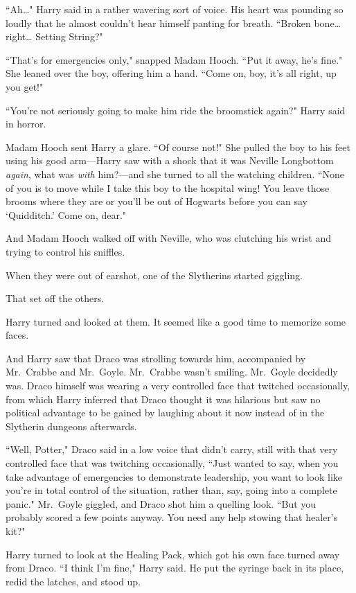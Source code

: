 ``Ah{\ldots}" Harry said in a rather wavering sort of voice. His heart was pounding so loudly that he almost couldn't hear himself panting for breath. ``Broken bone{\ldots} right{\ldots} Setting String?"

``That's for emergencies only," snapped Madam Hooch. ``Put it away, he's fine." She leaned over the boy, offering him a hand. ``Come on, boy, it's all right, up you get!"

``You're not seriously going to make him ride the broomstick again?" Harry said in horror.

Madam Hooch sent Harry a glare. ``Of course not!" She pulled the boy to his feet using his good arm—Harry saw with a shock that it was Neville Longbottom \emph{again}, what was \emph{with} him?—and she turned to all the watching children. ``None of you is to move while I take this boy to the hospital wing! You leave those brooms where they are or you'll be out of Hogwarts before you can say `Quidditch.' Come on, dear."

And Madam Hooch walked off with Neville, who was clutching his wrist and trying to control his sniffles.

When they were out of earshot, one of the Slytherins started giggling.

That set off the others.

Harry turned and looked at them. It seemed like a good time to memorize some faces.

And Harry saw that Draco was strolling towards him, accompanied by Mr.~Crabbe and Mr.~Goyle. Mr.~Crabbe wasn't smiling. Mr.~Goyle decidedly was. Draco himself was wearing a very controlled face that twitched occasionally, from which Harry inferred that Draco thought it was hilarious but saw no political advantage to be gained by laughing about it now instead of in the Slytherin dungeons afterwards.

``Well, Potter," Draco said in a low voice that didn't carry, still with that very controlled face that was twitching occasionally, ``Just wanted to say, when you take advantage of emergencies to demonstrate leadership, you want to look like you're in total control of the situation, rather than, say, going into a complete panic." Mr.~Goyle giggled, and Draco shot him a quelling look. ``But you probably scored a few points anyway. You need any help stowing that healer's kit?"

Harry turned to look at the Healing Pack, which got his own face turned away from Draco. ``I think I'm fine," Harry said. He put the syringe back in its place, redid the latches, and stood up.

